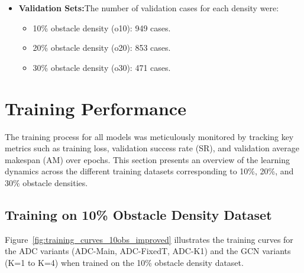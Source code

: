 \begin{itemize}
\begin{itemize}
        \item \textbf{Validation Sets:}The number of validation cases for each density were:
            \begin{itemize}
                \item 10\% obstacle density (o10): 949 cases.
                \item 20\% obstacle density (o20): 853 cases.
                \item 30\% obstacle density (o30): 471 cases.
            \end{itemize}
    \end{itemize}
\end{itemize}


\section{Training Performance}
\label{sec:training_performance}
The training process for all models was meticulously monitored by tracking key metrics such as training loss, validation success rate (SR), and validation average makespan (AM) over epochs. This section presents an overview of the learning dynamics across the different training datasets corresponding to 10\%, 20\%, and 30\% obstacle densities.
\subsection{Training on 10\% Obstacle Density Dataset}
\label{subsec:training_10obs}
Figure~\ref{fig:training_curves_10obs_improved} illustrates the training curves for the ADC variants (ADC-Main, ADC-FixedT, ADC-K1) and the GCN variants (K=1 to K=4) when trained on the 10\% obstacle density dataset.

